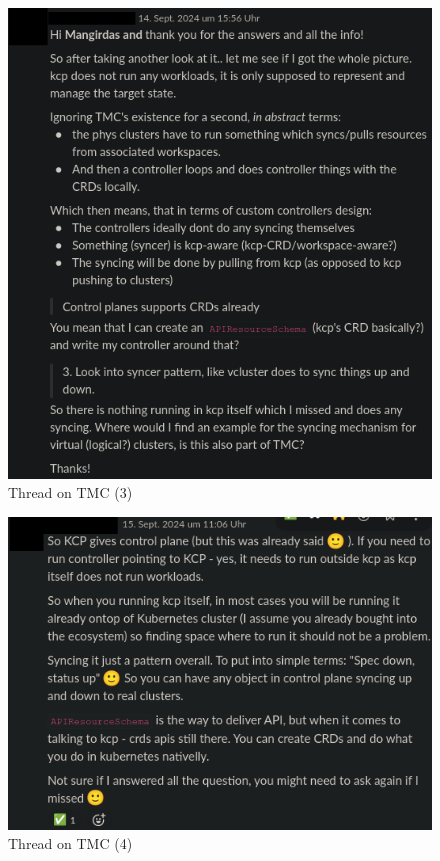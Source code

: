 \documentclass[11pt, a4paper, oneside, listof=totoc]{scrartcl}
\begin{document}
                \begin{figure}[h!]
                    \centering
                    \includegraphics[width=\textwidth]{screenshots/slack/tmc3.anonymized.png}
                    \caption{Thread on TMC (3)}\label{fig:tmc3}
                \end{figure}

                \begin{figure}[h!]
                    \centering
                    \includegraphics[width=\textwidth]{screenshots/slack/tmc4.anonymized.png}
                    \caption{Thread on TMC (4)}\label{fig:tmc4}
                \end{figure}
\end{document}
